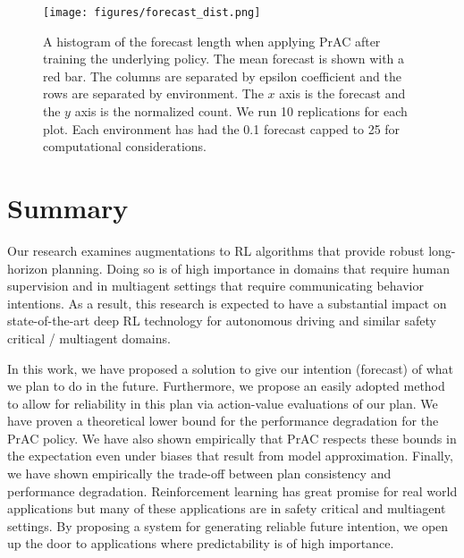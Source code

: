 \documentclass[letterpaper]{article} %
\begin{document}
\begin{figure}[!h]
    \texttt{[image: figures/forecast\_dist.png]}
    \caption{A histogram of the forecast length when applying  PrAC after training the underlying policy. The mean forecast is shown with a red bar. The columns are separated by epsilon coefficient and the rows are separated by environment. The $x$ axis is the forecast and the $y$ axis is the normalized count. We run 10 replications for each plot. Each environment has had the 0.1 forecast capped to 25 for computational considerations.}
    \label{forecast-dist}
\end{figure}


\section{Summary}
Our research examines augmentations to RL algorithms that provide robust long-horizon planning. Doing so is of high importance in domains that require human supervision and in multiagent settings that require communicating behavior intentions. As a result, this research is expected to have a substantial impact on state-of-the-art deep RL technology for autonomous driving and similar safety critical / multiagent domains.

In this work, we have proposed a solution to give our intention (forecast) of what we plan to do in the future. Furthermore, we propose an easily adopted method to allow for reliability in this plan via action-value evaluations of our plan. We have proven a theoretical lower bound for the performance degradation for the PrAC policy. We have also shown empirically that PrAC respects these bounds in the expectation even under biases that result from model approximation. Finally, we have shown empirically the trade-off between plan consistency and performance degradation. Reinforcement learning has great promise for real world applications but many of these applications are in safety critical and multiagent settings. By proposing a system for generating reliable future intention, we open up the door to applications where predictability is of high importance.



% 
\end{document}
